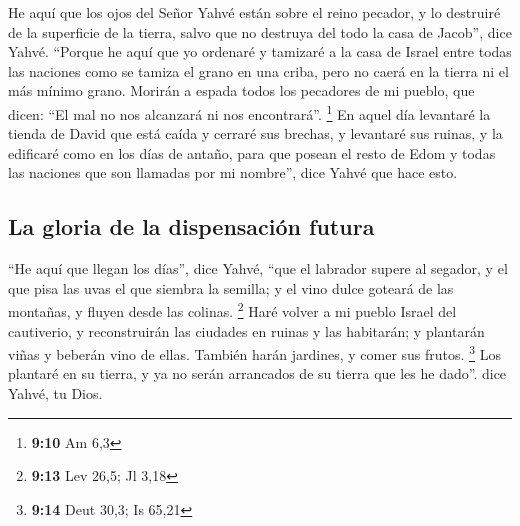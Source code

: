  He aquí que los ojos del Señor Yahvé están sobre el reino
pecador, y lo destruiré de la superficie de la tierra, salvo que no
destruya del todo la casa de Jacob'', dice Yahvé. 
``Porque he aquí que yo ordenaré y tamizaré a la casa de Israel entre
todas las naciones como se tamiza el grano en una criba, pero no caerá
en la tierra ni el más mínimo grano.  Morirán a espada
todos los pecadores de mi pueblo, que dicen: ``El mal no nos alcanzará
ni nos encontrará''. \footnote{\textbf{9:10} Am 6,3}  En
aquel día levantaré la tienda de David que está caída y cerraré sus
brechas, y levantaré sus ruinas, y la edificaré como en los días de
antaño,  para que posean el resto de Edom y todas las
naciones que son llamadas por mi nombre'', dice Yahvé que hace esto.

\hypertarget{la-gloria-de-la-dispensaciuxf3n-futura}{%
\subsection{La gloria de la dispensación
futura}\label{la-gloria-de-la-dispensaciuxf3n-futura}}

 ``He aquí que llegan los días'', dice Yahvé, ``que el
labrador supere al segador, y el que pisa las uvas el que siembra la
semilla; y el vino dulce goteará de las montañas, y fluyen desde las
colinas. \footnote{\textbf{9:13} Lev 26,5; Jl 3,18}  Haré
volver a mi pueblo Israel del cautiverio, y reconstruirán las ciudades
en ruinas y las habitarán; y plantarán viñas y beberán vino de ellas.
También harán jardines, y comer sus frutos. \footnote{\textbf{9:14} Deut
  30,3; Is 65,21}  Los plantaré en su tierra, y ya no
serán arrancados de su tierra que les he dado''. dice Yahvé, tu Dios.
